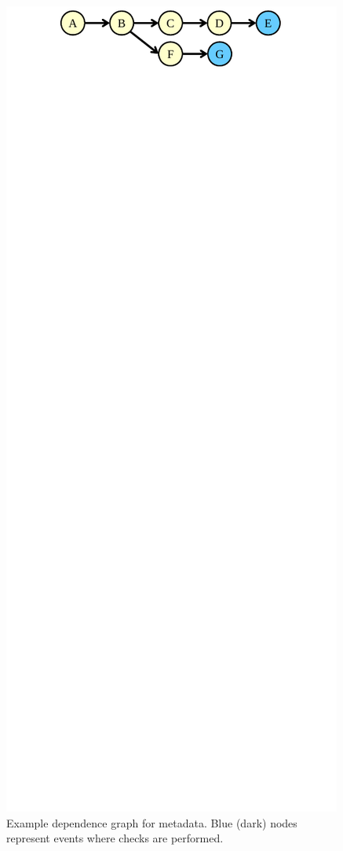 \begin{figure}
  \begin{center}
    \includegraphics[width=\columnwidth]{figs/dataflow_graph.pdf}
    \vspace{-0.3in}
    \caption{Example dependence graph for metadata. Blue (dark) nodes represent
    events where checks are performed.}
    \label{fig:drop.dataflow_graph}
    \vspace{-0.1in}
  \end{center}
\end{figure}

